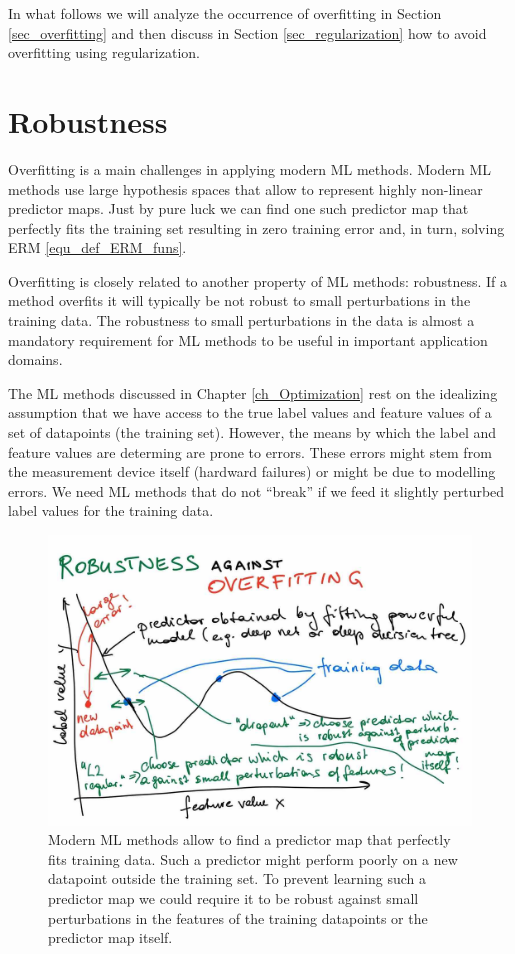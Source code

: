 \documentclass[12pt]{report}
\begin{document}
In what follows we will analyze the occurrence of overfitting 
in Section \ref{sec_overfitting} and then discuss in Section 
\ref{sec_regularization} how to avoid overfitting using regularization. 


\section{Robustness} 
\label{sec_robustness} 

Overfitting is a main challenges in applying modern ML methods. 
Modern ML methods use large hypothesis spaces that allow to 
represent highly non-linear predictor maps. Just by pure luck 
we can find one such predictor map that perfectly fits the 
training set resulting in zero training error and, in turn, solving 
ERM \eqref{equ_def_ERM_funs}. 

Overfitting is closely related to another property of ML methods: 
robustness. If a method overfits it will typically be not robust to 
small perturbations in the training data. The robustness to small 
perturbations in the data is almost a mandatory requirement for 
ML methods to be useful in important application domains. 

The ML methods discussed in Chapter \ref{ch_Optimization} rest on the 
idealizing assumption that we have access to the true label values and feature 
values of a set of datapoints (the training set). However, the means by which 
the label and feature values are determing are prone to errors. These errors might 
stem from the measurement device itself (hardward failures) or might be 
due to modelling errors. We need ML methods that do not ``break'' if we feed 
it slightly perturbed label values for the training data. 




 \begin{figure}[htbp]
	\centering
	\includegraphics[width=\textwidth]{RobustnessOverfitting.jpg}  
	\caption{Modern ML methods allow to find a predictor map that perfectly fits 
		training data. Such a predictor might perform poorly on a new datapoint 
		outside the training set. To prevent learning such a predictor 
		map we could require it to be robust against small perturbations in the features of the 
        training datapoints or the predictor map itself.}
	\label{fig_polyn_training}
\end{figure}
\end{document}
